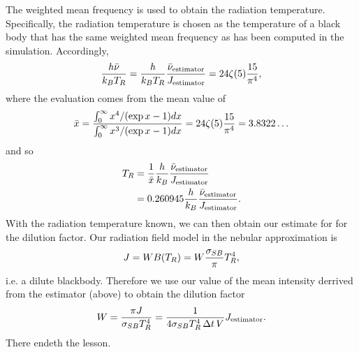 \documentclass[letterpaper,10pt,english]{sphinxmanual}
\begin{document}
The weighted mean frequency is used to obtain the radiation temperature. Specifically, the radiation temperature is chosen as the
temperature of a black body that has the same weighted mean frequency as has been computed in the simulation. Accordingly,
\begin{gather}
\begin{split}\frac{h \bar{\nu}}{k_{B} T_{R}} = \frac{h}{k_{B} T_{R}} \frac{\bar{\nu}_\textrm{estimator}}{J_\textrm{estimator}}
  = 24 \zeta(5) \frac{15}{\pi^4},\end{split}\notag
\end{gather}
where the evaluation comes from the mean value of
\begin{gather}
\begin{split}\bar{x} = \frac{ \int_0^{\infty} x^4 / (\exp{x} - 1)dx}{\int_0^{\infty} x^3 / (\exp{x} - 1)dx} =
24 \zeta(5) \frac{15}{\pi^4} = 3.8322\dots\end{split}\notag
\end{gather}
and so
\begin{gather}
\begin{split}T_{R} &= \frac{1}{\bar{x}} \frac{h}{k_{B}} \frac{\bar{\nu}_\textrm{estimator}}{J_\textrm{estimator}} \\
&= 0.260945 \frac{h}{k_{B}} \frac{\bar{\nu}_\textrm{estimator}}{J_\textrm{estimator}}.\end{split}\notag
\end{gather}
With the radiation temperature known, we can then obtain our estimate for for the dilution factor. Our radiation field model in the
nebular approximation is
\begin{gather}
\begin{split}J = W B(T_{R}) = W \frac{\sigma_{SB}}{\pi} T_{R}^4,\end{split}\notag
\end{gather}
i.e. a dilute blackbody. Therefore we use our value of the mean intensity derrived from the estimator (above) to obtain the
dilution factor
\begin{gather}
\begin{split}W = \frac{\pi J}{\sigma_{SB} T_{R}^4} = \frac{1}{4\sigma_{SB} T_{R}^4\, \Delta t\, V} J_\textrm{estimator}.\end{split}\notag
\end{gather}
There endeth the lesson.
\end{document}
